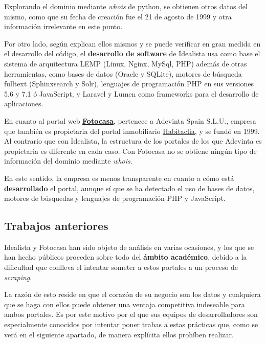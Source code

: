 \documentclass[12pt]{article}
\begin{document}
Explorando el dominio mediante \textit{whois} de python, se obtienen otros datos del mismo, como que su fecha de creación fue el 21 de agosto de 1999 y otra información irrelevante en este punto.

Por otro lado, según explican ellos mismos y se puede verificar en gran medida en el desarrollo del código, el \textbf{desarrollo de software} de Idealista usa como base el sistema de arquitectura LEMP (Linux, Nginx, MySql, PHP) además de otras herramientas, como bases de datos (Oracle y SQLite), motores de búsqueda fulltext (Sphinxsearch y Solr), lenguajes de programación PHP en sus versiones 5.6 y 7.1 ó JavaScript, y Laravel y Lumen como frameworks para el desarrollo de aplicaciones.

En cuanto al portal web \href{https://www.fotocasa.es/es/}{\textbf{\underline{Fotocasa}}}, pertenece a Adevinta Spain S.L.U., empresa que también es propietaria del portal inmobiliario \href{https://www.habitaclia.com/madrid}{\underline{Habitaclia}}, y se fundó en 1999. Al contrario que con Idealista, la estructura de los portales de los que Adevinta es propietaria es diferente en cada caso. Con Fotocasa no se obtiene ningún tipo de información del dominio mediante \textit{whois}. 

En este sentido, la empresa es menos transparente en cuanto a cómo está \textbf{desarrollado} el portal, aunque sí que se ha detectado el uso de bases de datos, motores de búsquedas y lenguajes de programación PHP y JavaScript.

\vspace{-1.5em}\subsection*{Trabajos anteriores}\vspace{-1.0em}

Idealista y Fotocasa han sido objeto de análisis en varias ocasiones, y los que se han hecho públicos proceden sobre todo del \textbf{ámbito académico}, debido a la dificultad que conlleva el intentar someter a estos portales a un proceso de \textit{scraping}.

La razón de esto reside en que el corazón de su negocio son los datos y cualquiera que se haga con ellos puede obtener una ventaja competitiva indeseable para ambos portales. Es por este motivo por el que sus equipos de desarrolladores son especialmente conocidos por intentar poner trabas a estas prácticas que, como se verá en el siguiente apartado, de manera explícita ellos prohíben realizar.
\end{document}
